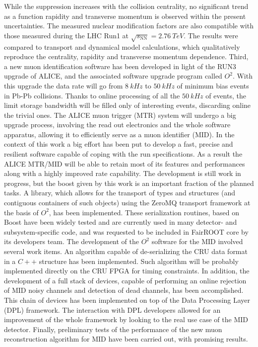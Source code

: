 While the suppression increases with the collision centrality, no significant trend as a function rapidity and transverse momentum is observed within the present uncertainties. 
The measured nuclear modification factors are also compatible with those measured during the LHC Run1 at $\sqrt{s_{\mathrm{NN}}}=2.76\ TeV$.
The results were compared to transport and dynamical model calculations, which qualitatively reproduce the centrality, rapidity and transverse momentum dependence.
Third, a new muon identification software has been developed in light of the RUN3 upgrade of ALICE, and the associated software upgrade program called $O^2$.
With this upgrade the data rate will go from $8\ kHz$ to $50\ kHz$ of minimum bias events in Pb-Pb collisions.
Thanks to online processing of all the $50\ kHz$ of events, the limit storage bandwidth will be filled only of interesting events, discarding online the trivial ones.
The ALICE muon trigger (MTR) system will undergo a big upgrade process, involving the read out electronics and the whole software apparatus, allowing it to efficiently serve as a muon identifier (MID).
In the context of this work a big effort has been put to develop a fast, precise and resilient software capable of coping with the run specifications. 
As a result the ALICE MTR/MID will be able to retain most of its features and performances along with a highly improved rate capability. 
The development is still work in progress, but the boost given by this work is an important fraction of the planned tasks.
A library, which allows for the transport of  types and structures (and contiguous containers of such objects) using the ZeroMQ transport framework at the basis of $O^2$, has been implemented.
These serialization routines, based on Boost have been widely tested and are currently used in many detector- and subsystem-specific code, and was requested to be included in FairROOT core by its developers team. 
The development of the $O^2$ software for the MID involved several work items.
An algorithm capable of de-serializing the CRU data format in a $C++$ structure has been implemented.
Such algorithm will be probably implemented directly on the CRU FPGA for timing constraints.
In addition, the development of a full stack of devices, capable of performing an online rejection of MID noisy channels and detection of dead channels, has been accomplished.
This chain of devices has been implemented on top of the Data Processing Layer (DPL) framework.
The interaction with DPL developers allowed for an improvement of the whole framework by looking to the real use case of the MID detector.
Finally, preliminary tests of the performance of the new muon reconstruction algorithm for MID have been carried out, with promising results.

